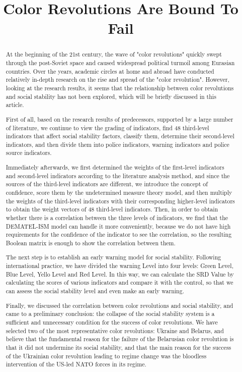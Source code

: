 \documentclass[12pt]{article}  %
\title{ Color Revolutions Are Bound To Fail}  %
\begin{document}
\begin{abstract}
   At the beginning of the 21st century, the wave of "color revolutions" quickly swept through the post-Soviet space and caused widespread political turmoil among Eurasian countries. Over the years, academic circles at home and abroad have conducted relatively in-depth research on the rise and spread of the "color revolution". However, looking at the research results, it seems that the relationship between color revolutions and social stability has not been explored, which will be briefly discussed in this article.

First of all, based on the research results of predecessors, supported by a large number of literature, we continue to view the grading of indicators, find 48 third-level indicators that affect social stability factors, classify them, determine their second-level indicators, and then divide them into police indicators, warning indicators and police source indicators.

Immediately afterwards, we first determined the weights of the first-level indicators and second-level indicators according to the literature analysis method, and since the sources of the third-level indicators are different, we introduce the concept of confidence, score them by the undetermined measure theory model, and then multiply the weights of the third-level indicators with their corresponding higher-level indicators to obtain the weight vectors of 48 third-level indicators. Then, in order to obtain whether there is a correlation between the three levels of indicators, we find that the DEMATEL-ISM model can handle it more conveniently, because we do not have high requirements for the confidence of the indicator to see the correlation, so the resulting Boolean matrix is enough to show the correlation between them.

The next step is to establish an early warning model for social stability. Following international practice, we have divided the warning Level into four levels: Green Level, Blue Level, Yello Level and Red Level. In this way, we can calculate the SRD Value by calculating the scores of various indicators and compare it with the control, so that we can assess the social stability level and even make an early warning.

Finally, we discussed the correlation between color revolutions and social stability, and came to a preliminary conclusion: the collapse of the social stability system is a sufficient and unnecessary condition for the success of color revolutions. We have selected two of the most representative color revolutions: Ukraine and Belarus, and believe that the fundamental reason for the failure of the Belarusian color revolution is that it did not undermine its social stability, and that the main reason for the success of the Ukrainian color revolution leading to regime change was the bloodless intervention of the US-led NATO forces in its regime.


\end{abstract}
\end{document}
